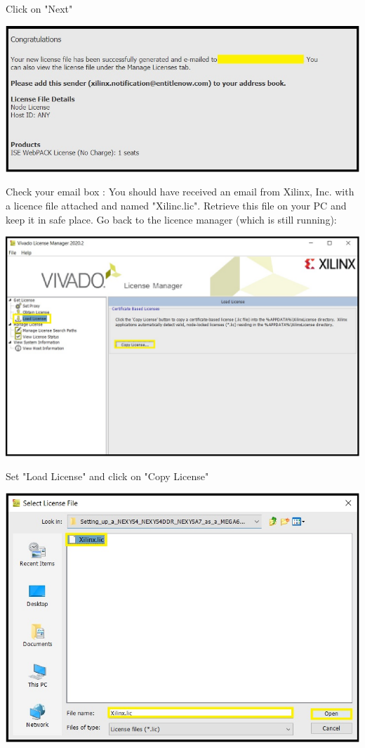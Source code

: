 Click on "Next"

\includegraphics[width=\linewidth]{images/VivadoInstimg029.jpg}

Check your email box : You should have received an email from Xilinx, Inc. with a licence file attached and named "Xilinc.lic".
Retrieve this file on your PC and keep it in safe place.
Go back to the licence manager (which is still running):

\includegraphics[width=\linewidth]{images/VivadoInstimg030.jpg}

Set "Load License" and click on "Copy License"

\includegraphics[width=\linewidth]{images/VivadoInstimg031.jpg}

